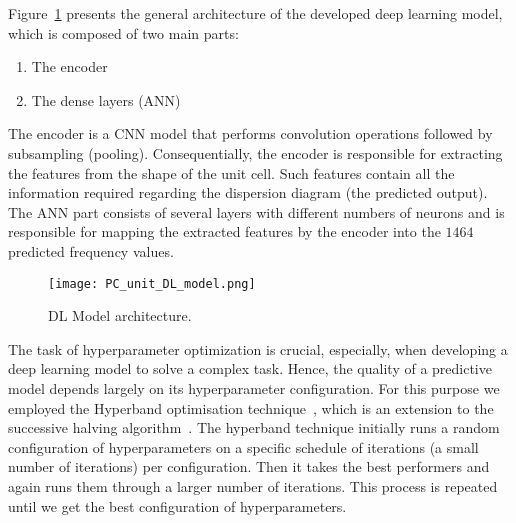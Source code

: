 Figure~\ref{DL_model} presents the general architecture of the developed deep learning model, which is composed of two main parts:		
\begin{enumerate}
	\item The encoder
	\item The dense layers (ANN)
\end{enumerate}
The encoder is a CNN model that performs convolution operations followed by subsampling (pooling). 
Consequentially, the encoder is responsible for extracting the features from the shape of the unit cell.
Such features contain all the information required regarding the dispersion diagram (the predicted output).
The ANN part consists of several layers with different numbers of neurons and is responsible for mapping the extracted features by the encoder into the \(1464\) predicted frequency values.

\begin{figure}
	\centering
	\texttt{[image: PC\_unit\_DL\_model.png]}
	\caption{DL Model architecture.}
	\label{DL_model}
\end{figure}

The task of hyperparameter optimization is crucial, especially, when developing a deep learning model to solve a complex task.
Hence, the quality of a predictive model depends largely on its hyperparameter configuration.
For this purpose we employed the Hyperband optimisation technique~\cite{Li2018}, which is an extension to the successive halving algorithm~\cite{Jamieson2016}.
The hyperband technique initially runs a random configuration of hyperparameters on a specific schedule of iterations (a small number of iterations) per configuration.
Then it takes the best performers and again runs them through a larger number of iterations.
This process is repeated until we get the best configuration of hyperparameters.

